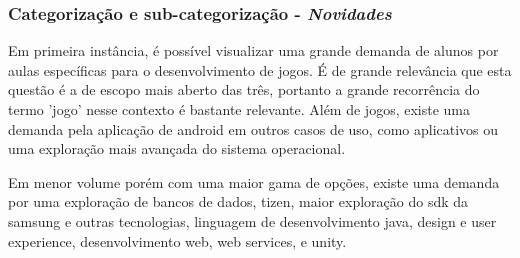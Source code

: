 

\subsubsection*{Categorização e sub-categorização - \textit{Novidades}}

Em primeira instância, é possível visualizar uma grande demanda de alunos por aulas específicas para o desenvolvimento de jogos. É de grande relevância que esta questão é a de escopo mais aberto das três, portanto a grande recorrência do termo 'jogo' nesse contexto é bastante relevante. Além de jogos, existe uma demanda pela aplicação de android em outros casos de uso, como aplicativos ou uma exploração mais avançada do sistema operacional. 

Em menor volume porém com uma maior gama de opções, existe uma demanda por uma exploração de bancos de dados, tizen, maior exploração do sdk da samsung e outras tecnologias, linguagem de desenvolvimento java, design e user experience, desenvolvimento web, web services, e unity. 

